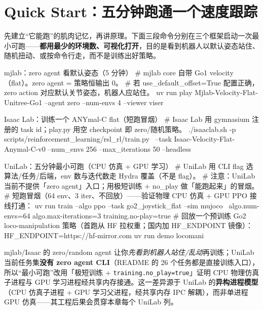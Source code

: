 \section{Quick Start：五分钟跑通一个速度跟踪}
\label{sec:rlmc-ql-quickstart}

先建立“它能跑”的肌肉记忆，再讲原理。下面三段命令分别在三个框架启动一次最小可跑——\textbf{都用最少的环境数、可视化打开}，目的是看到机器人以默认姿态站住、随机扭动、或按命令行走，而不是训练出好策略。

\begin{codebox}[bash]{mjlab：zero agent 看默认姿态（5 分钟）}
# mjlab core 自带 Go1 velocity（flat）。zero agent = 策略恒输出 0。
# 若 use_default_offset=True 配置正确，zero action 对应默认关节姿态，机器人应站住。
uv run play Mjlab-Velocity-Flat-Unitree-Go1 --agent zero --num-envs 4 --viewer viser
\end{codebox}

\begin{codebox}[bash]{Isaac Lab：训练一个 ANYmal-C flat（短跑冒烟）}
# Isaac Lab 用 gymnasium 注册的 task id；play.py 用空 checkpoint 即 zero/随机策略。
./isaaclab.sh -p scripts/reinforcement_learning/rsl_rl/train.py \
  --task Isaac-Velocity-Flat-Anymal-C-v0 --num_envs 256 --max_iterations 50 --headless
\end{codebox}

\begin{codebox}[bash]{UniLab：五分钟最小可跑（CPU 仿真 + GPU 学习）}
# UniLab 用 CLI flag 选 算法/任务/后端，env 数与迭代数走 Hydra 覆盖（不是 flag）。
# 注意：UniLab 当前不提供「zero agent」入口；用极短训练 + no_play 做「能跑起来」的冒烟。
# 短跑冒烟（64 env、3 iter、不回放）——验证物理 CPU 仿真 + GPU PPO 接线打通：
uv run train --algo ppo --task go2_joystick_flat --sim mujoco \
    algo.num-envs=64 algo.max-iterations=3 training.no-play=true
# 回放一个预训练 Go2 loco-manipulation 策略（首跑从 HF 拉权重；国内加 HF_ENDPOINT 镜像）：
HF_ENDPOINT=https://hf-mirror.com uv run demo locomani
\end{codebox}

\begin{note}
mjlab/Isaac 的 zero/random agent 让你\emph{先看到机器人站住/乱动}再训练；UniLab 当前任务集\textbf{没有 zero agent CLI}（README 的 26 个任务都是直接训练入口），所以“最小可跑”改用「极短训练 + \texttt{training.no\_play=true}」证明 CPU 物理仿真子进程与 GPU 学习进程经共享内存接通。这一差异源于 UniLab 的\textbf{异构进程模型}（CPU 仿真子进程 + GPU 学习父进程，经共享内存 IPC 解耦），而非单进程 GPU 仿真——其工程后果会贯穿本章每个 UniLab 列。
\end{note}

